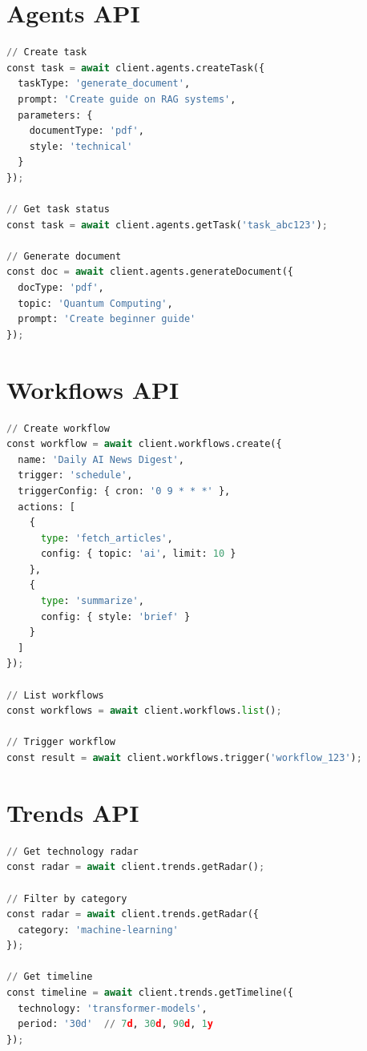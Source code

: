 \documentclass{report}
\begin{document}
\section{Agents API}

\begin{lstlisting}[language=Python]
// Create task
const task = await client.agents.createTask({
  taskType: 'generate_document',
  prompt: 'Create guide on RAG systems',
  parameters: {
    documentType: 'pdf',
    style: 'technical'
  }
});

// Get task status
const task = await client.agents.getTask('task_abc123');

// Generate document
const doc = await client.agents.generateDocument({
  docType: 'pdf',
  topic: 'Quantum Computing',
  prompt: 'Create beginner guide'
});
\end{lstlisting}

\section{Workflows API}

\begin{lstlisting}[language=Python]
// Create workflow
const workflow = await client.workflows.create({
  name: 'Daily AI News Digest',
  trigger: 'schedule',
  triggerConfig: { cron: '0 9 * * *' },
  actions: [
    {
      type: 'fetch_articles',
      config: { topic: 'ai', limit: 10 }
    },
    {
      type: 'summarize',
      config: { style: 'brief' }
    }
  ]
});

// List workflows
const workflows = await client.workflows.list();

// Trigger workflow
const result = await client.workflows.trigger('workflow_123');
\end{lstlisting}

\section{Trends API}

\begin{lstlisting}[language=Python]
// Get technology radar
const radar = await client.trends.getRadar();

// Filter by category
const radar = await client.trends.getRadar({
  category: 'machine-learning'
});

// Get timeline
const timeline = await client.trends.getTimeline({
  technology: 'transformer-models',
  period: '30d'  // 7d, 30d, 90d, 1y
});
\end{lstlisting}
\end{document}
